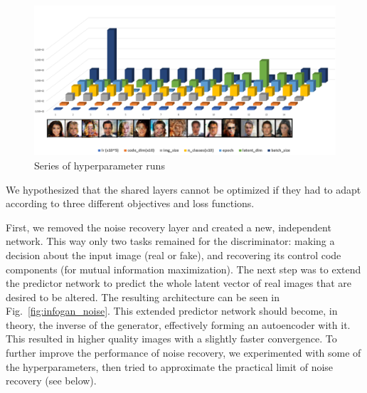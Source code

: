 \documentclass{egpubl}
\begin{document}
\begin{figure}[!ht]
	\centering
	\includegraphics[width=\textwidth]{pic/hyperparamopt}
	\caption{Series of hyperparameter runs}
	\label{fig:hyperparamteres}
\end{figure}

We hypothesized that the shared layers cannot be optimized if they had to adapt according to three different objectives and loss functions.

First, we removed the noise recovery layer and created a new, independent network. This way only two tasks remained for the discriminator: making a decision about the input image (real or fake), and recovering its control code components (for mutual information maximization). The next step was to extend the predictor network to predict the whole latent vector of real images that are desired to be altered. The resulting architecture can be seen in Fig.~\ref{fig:infogan_noise}. This extended predictor network should become, in theory, the inverse of the generator, effectively forming an autoencoder with it. This resulted in higher quality images with a slightly faster convergence. To further improve the performance of noise recovery, we experimented with some of the hyperparameters, then tried to approximate the practical limit of noise recovery (see below).
\end{document}
